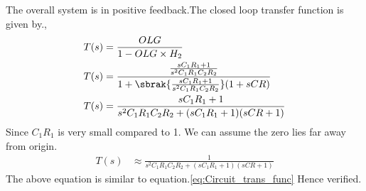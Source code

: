 \begin{enumerate}[label=\arabic*.,ref=\theenumi]
\solution The overall system is in positive feedback.The closed loop transfer function is given by.,
\begin{align}
    T(s) &= \frac{OLG}{1-OLG\times H_2}\\
    T(s) &= \frac{\frac{sC_1R_1+1}{s^2C_1R_1C_2R_2}}{1+\sbrak{\frac{sC_1R_1+1}{s^2C_1R_1C_2R_2}}(1+sCR)}\\
    T(s) &= \frac{sC_1R_1+1}{s^2C_1R_1C_2R_2+(sC_1R_1+1)(sCR+1)}
\end{align}
Since $C_1R_1$ is very small compared to 1. We can assume the zero lies far away from origin.
\begin{align}
    T(s) &\approx  \frac{1}{s^2C_1R_1C_2R_2+(sC_1R_1+1)(sCR+1)}
\end{align}
The above equation is similar to equation.\ref{eq:Circuit_trans_func}
Hence verified.


\end{enumerate}
